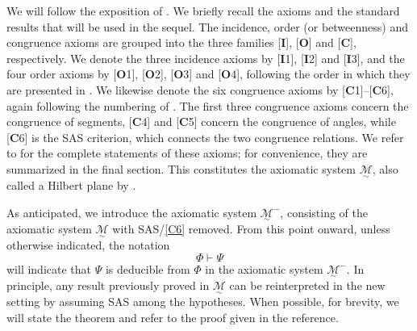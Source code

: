 \documentclass[11pt,a4paper]{article}
\theoremstyle{definition}
\theoremstyle{remark}
\numberwithin{equation}{section}
\newcommand{\MG}{\underset{\sim}{\mathcal{M}}} %
\begin{document}
We will follow the exposition of \cite{Greenberg1993}. We briefly recall the axioms and the standard results that
will be used in the sequel. The incidence, order (or betweenness) and congruence axioms are grouped into the three
families [\textbf{I}], [\textbf{O}] and [\textbf{C}], respectively. We
denote the three incidence axioms by [\textbf{I}1], [\textbf{I}2] and
[\textbf{I}3], and the four order axioms by [\textbf{O}1],
[\textbf{O}2], [\textbf{O}3] and [\textbf{O}4], following the order in
which they are presented in \cite{Greenberg1993}. We likewise denote the six
congruence axioms by [\textbf{C}1]--[\textbf{C}6], again following
the numbering of \cite{Greenberg1993}. The first three congruence axioms concern
the congruence of segments, [\textbf{C}4] and [\textbf{C}5] concern the
congruence of angles, while [\textbf{C}6] is the SAS criterion, which
connects the two congruence relations. We refer to \cite{Greenberg1993} for the complete statements of these axioms; for convenience, they are summarized in the final section. This constitutes the axiomatic system $\MG$, also called a Hilbert plane by \cite{Hartshorne2000}.

As anticipated, we introduce the axiomatic system $\MG^{-}$, consisting of the axiomatic system $\MG$ with SAS/\ref{C6} removed. From this point onward, unless otherwise indicated, the notation
\begin{equation*}
\Phi\vdash\Psi
\end{equation*}
will indicate that $\Psi$ is deducible from $\Phi$ in the axiomatic system $\MG^{-}$. In principle, any result previously proved in $\MG$ can be reinterpreted in the new setting by assuming SAS among the hypotheses. When possible, for brevity, we will state the theorem and refer to the proof given in the reference.
\end{document}
